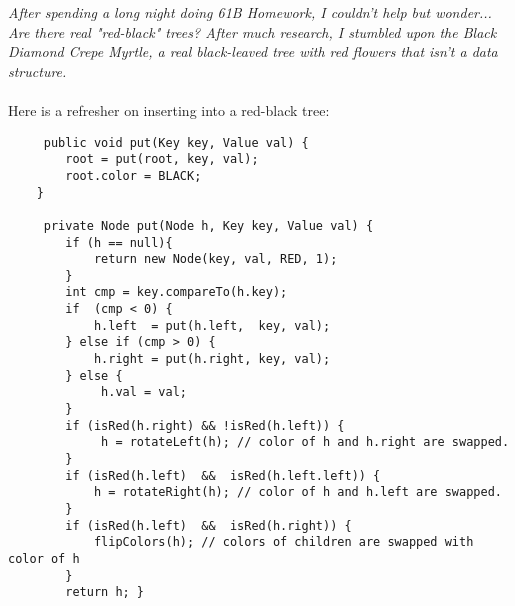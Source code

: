 \emph{After spending a long night doing 61B Homework, I couldn't help but wonder... Are there real "red-black" trees? After much research, I stumbled upon the Black Diamond Crepe Myrtle, a real black-leaved tree with red flowers that isn't a data structure. }
\\
\\
Here is a refresher on inserting into a red-black tree:
\begin{lstlisting}
     public void put(Key key, Value val) {
        root = put(root, key, val);
        root.color = BLACK;
    }
    
     private Node put(Node h, Key key, Value val) { 
        if (h == null){
            return new Node(key, val, RED, 1);
        }
        int cmp = key.compareTo(h.key);
        if  (cmp < 0) {
            h.left  = put(h.left,  key, val); 
        } else if (cmp > 0) {
            h.right = put(h.right, key, val); 
        } else {
             h.val = val;
        }          
        if (isRed(h.right) && !isRed(h.left)) {
             h = rotateLeft(h); // color of h and h.right are swapped.
        }    
        if (isRed(h.left)  &&  isRed(h.left.left)) {
            h = rotateRight(h); // color of h and h.left are swapped.
        }
        if (isRed(h.left)  &&  isRed(h.right)) {
            flipColors(h); // colors of children are swapped with color of h
        }    
        return h; }

\end{lstlisting}